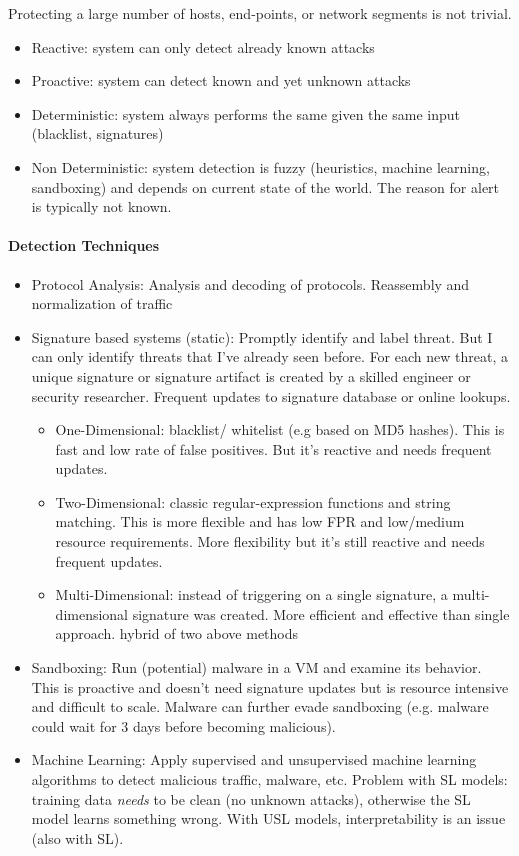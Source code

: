 Protecting a large number of hosts, end-points, or network segments is not trivial.
\begin{itemize}
    \item Reactive: system can only detect already known attacks
	\item Proactive: system can detect known and yet unknown attacks
	\item Deterministic: system always performs the same given the same input (blacklist, signatures)
	\item Non Deterministic: system detection is fuzzy (heuristics, machine	learning, sandboxing) and depends on current state of the world. The reason for alert is typically not known.
\end{itemize}

\paragraph{Detection Techniques}

\begin{itemize}
    \item Protocol Analysis: Analysis and decoding of protocols. Reassembly and normalization of traffic
	\item Signature based systems (static): Promptly identify and label threat. But I can only identify threats that I've already seen before. For each new threat, a unique signature or signature artifact is created by a skilled engineer or security researcher. Frequent updates to signature database or online lookups.
	\begin{itemize}
		\item One-Dimensional: blacklist/ whitelist (e.g based on MD5 hashes). This is fast and low rate of false positives. But it's reactive and needs frequent updates.
		\item Two-Dimensional: classic regular-expression functions and string matching. This is more flexible and has low FPR and low/medium resource requirements. More flexibility but it's still reactive and needs frequent updates.
		\item Multi-Dimensional: instead of triggering on a single signature, a	multi-dimensional signature was created. More efficient and effective than single approach. hybrid of two above methods
	\end{itemize}
	\item Sandboxing: Run (potential) malware in a VM and examine its behavior. This is proactive and doesn't need signature updates but is resource intensive and difficult to scale. Malware can further evade sandboxing (e.g. malware could wait for 3 days before becoming malicious).
	\item Machine Learning: Apply supervised and unsupervised machine learning algorithms to detect malicious traffic, malware, etc. Problem with SL models: training data \textit{needs} to be clean (no unknown attacks), otherwise the SL model learns something wrong. With USL models, interpretability is an issue (also with SL).
\end{itemize}

